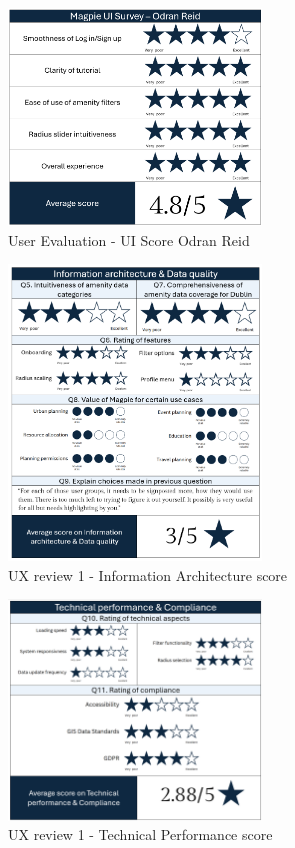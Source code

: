 \begin{figure}[htbp]
    \centering
    \includegraphics[width=0.6\textwidth]{images/survey-odran.png}
    \caption{User Evaluation - UI Score Odran Reid}
    \label{fig:odranscore}
\end{figure}

\begin{figure}[h!]
    \centering
    \includegraphics[width=0.6\textwidth]{images/ux-survey1-data.png}
    \caption{UX review 1 - Information Architecture score}
    \label{fig:ux1datascore}
\end{figure}

\begin{figure}[h!]
    \centering
    \includegraphics[width=0.6\textwidth]{images/ux-survey1-technical.png}
    \caption{UX review 1 - Technical Performance score}
    \label{fig:ux1compliancescore}
\end{figure}

